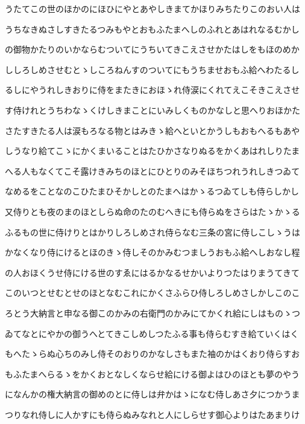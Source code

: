 \documentclass[a4paper,11pt,landscape]{ltjtarticle}
\begin{document}
\par\medskip
うたてこの世のほかのにほひにやとあやしきまてかほりみちたりこのおい人は
\par\medskip
うちなきぬさしすきたるつみもやとおもふたまへしのふれとあはれなるむかし
\par\medskip
の御物かたりのいかならむついてにうちいてきこえさせかたはしをもほのめか
\par\medskip
ししろしめさせむとゝしころねんすのついてにもうちませおもふ給へわたるし
\par\medskip
るしにやうれしきおりに侍をまたきにおほゝれ侍涙にくれてえこそきこえさせ
\par\medskip
す侍けれとうちわなゝくけしきまことにいみしくものかなしと思へりおほかた
\par\medskip
さたすきたる人は涙もろなる物とはみきゝ給へといとかうしもおもへるもあや
\par\medskip
しうなり給てこゝにかくまいることはたひかさなりぬるをかくあはれしりたま
\par\medskip
へる人もなくてこそ露けきみちのほとにひとりのみそほちつれうれしきつゐて
\par\medskip
なめるをことなのこひたまひそかしとのたまへはかゝるつゐてしも侍らしかし
\par\medskip
又侍りとも夜のまのほとしらぬ命のたのむへきにも侍らぬをさらはたゝかゝる
\par\medskip
ふるもの世に侍けりとはかりしろしめされ侍らなむ三条の宮に侍しこしゝうは
\par\medskip
かなくなり侍にけるとほのきゝ侍しそのかみむつましうおもふ給へしおなし程
\par\medskip
の人おほくうせ侍にける世のすゑにはるかなるせかいよりつたはりまうてきて
\par\medskip
このいつとせむとせのほとなむこれにかくさふらひ侍しろしめさしかしこのこ
\par\medskip
ろとう大納言と申なる御このかみの右衛門のかみにてかくれ給にしはものゝつ
\par\medskip
ゐてなとにやかの御うへとてきこしめしつたふる事も侍らむすき給ていくはく
\par\medskip
もへたゝらぬ心ちのみし侍そのおりのかなしさもまた袖のかはくおり侍らすお
\par\medskip
もふたまへらるゝをかくおとなしくならせ給にける御よはひのほとも夢のやう
\par\medskip
になんかの権大納言の御めのとに侍しは弁かはゝになむ侍しあさ夕につかうま
\par\medskip
つりなれ侍しに人かすにも侍らぬみなれと人にしらせす御心よりはたあまりけ
\end{document}
